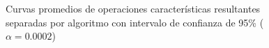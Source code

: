\begin{figure}[!ht]
\caption[Curva operaciones promedio junto con intervalo de confianza de 95\% ($\alpha=0.0002$)]{Curvas promedios de operaciones características resultantes separadas por algoritmo con intervalo de confianza de 95\%  ($\alpha=0.0002$)}
\label{fig:resultado_global_ci_2}
\end{figure}






%
%


